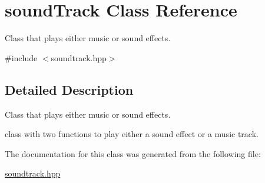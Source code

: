 \hypertarget{classsound_track}{}\section{sound\+Track Class Reference}
\label{classsound_track}


Class that plays either music or sound effects.  




{\ttfamily \#include $<$soundtrack.\+hpp$>$}



\subsection{Detailed Description}
Class that plays either music or sound effects. 

class with two functions to play either a sound effect or a music track. 

The documentation for this class was generated from the following file\+:\begin{DoxyCompactItemize}
\item 
\hyperlink{soundtrack_8hpp}{soundtrack.\+hpp}\end{DoxyCompactItemize}

